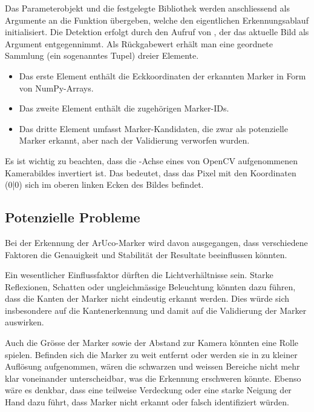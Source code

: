 Das Parameterobjekt und die festgelegte Bibliothek werden anschliessend als Argumente an die Funktion  übergeben, welche den eigentlichen Erkennungsablauf initialisiert.
Die Detektion erfolgt durch den Aufruf von , der das aktuelle Bild als Argument entgegennimmt.
Als Rückgabewert erhält man eine geordnete Sammlung (ein sogenanntes Tupel) dreier Elemente.

\begin{itemize}
    \item Das erste Element enthält die Eckkoordinaten der erkannten Marker in Form von NumPy-Arrays.
    \item Das zweite Element enthält die zugehörigen Marker-IDs.
    \item Das dritte Element umfasst Marker-Kandidaten\footnotemark{}, die zwar als potenzielle Marker erkannt, aber nach der Validierung verworfen wurden.
\end{itemize}

Es ist wichtig zu beachten, dass die -Achse eines von OpenCV aufgenommenen Kamerabildes invertiert ist.
Das bedeutet, dass das Pixel mit den Koordinaten (0|0) sich im oberen linken Ecken des Bildes befindet.


\subsection{Potenzielle Probleme}
Bei der Erkennung der ArUco-Marker wird davon ausgegangen, dass verschiedene Faktoren die Genauigkeit und Stabilität der Resultate beeinflussen könnten.

Ein wesentlicher Einflussfaktor dürften die Lichtverhältnisse sein.
Starke Reflexionen, Schatten oder ungleichmässige Beleuchtung könnten dazu führen, dass die Kanten der Marker nicht eindeutig erkannt werden.
Dies würde sich insbesondere auf die Kantenerkennung und damit auf die Validierung der Marker auswirken.

Auch die Grösse der Marker sowie der Abstand zur Kamera könnten eine Rolle spielen.
Befinden sich die Marker zu weit entfernt oder werden sie in zu kleiner Auflösung aufgenommen, wären die schwarzen und weissen Bereiche nicht mehr klar voneinander unterscheidbar, was die Erkennung erschweren könnte.
Ebenso wäre es denkbar, dass eine teilweise Verdeckung oder eine starke Neigung der Hand dazu führt, dass Marker nicht erkannt oder falsch identifiziert würden.

